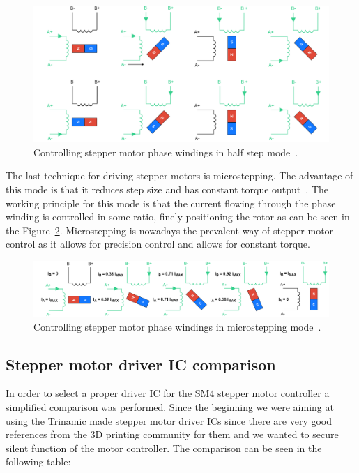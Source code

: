 \begin{figure}[H]
    \centering
    \includegraphics[width=\textwidth]{obrazky/half_step_principle}
    \caption{Controlling stepper motor phase windings in half step mode~\cite{carmine_fiore_stepper_2021}.}
    \label{fig:stepper_half_step_mode}
\end{figure}

The last technique for driving stepper motors is microstepping.
The advantage of this mode is that it reduces step size and has constant torque output~\cite{carmine_fiore_stepper_2021}.
The working principle for this mode is that the current flowing through the phase winding is controlled in some ratio, finely positioning the rotor as can be seen in the Figure~\ref{fig:microstepping}.
Microstepping is nowadays the prevalent way of stepper motor control as it allows for precision control and allows for constant torque.

\begin{figure}[H]
    \centering
    \includegraphics[width=\textwidth]{obrazky/microstepping}
    \caption{Controlling stepper motor phase windings in microstepping mode~\cite{carmine_fiore_stepper_2021}.}
    \label{fig:microstepping}
\end{figure}


\subsection{Stepper motor driver IC comparison}
\label{subsec:stepper_ic}
In order to select a proper driver IC for the SM4 stepper motor controller a simplified comparison was performed.
Since the beginning we were aiming at using the Trinamic made stepper motor driver ICs since there are very good references from the 3D printing community for them and we wanted to secure silent function of the motor controller.
The comparison can be seen in the following table:

